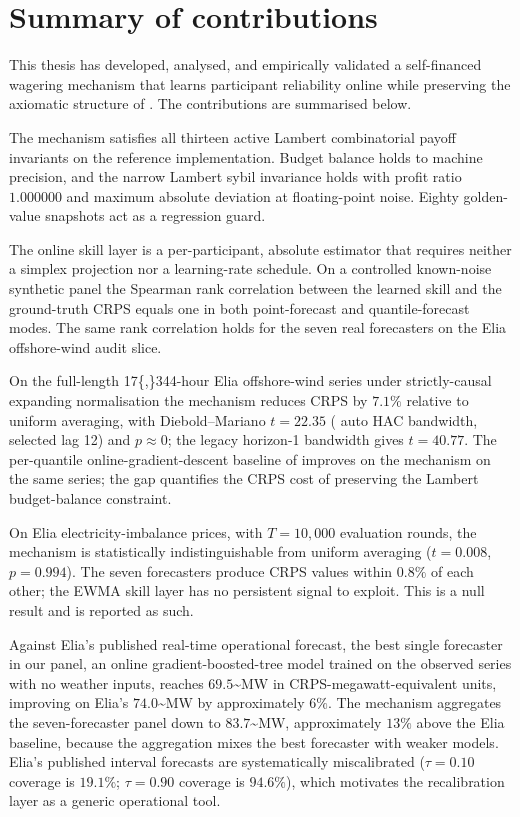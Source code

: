 \documentclass[
  11pt,
  a4paper,
  oneside]{report}
\begin{document}
\section{Summary of contributions}\label{summary-of-contributions}

This thesis has developed, analysed, and empirically validated a
self-financed wagering mechanism that learns participant reliability
online while preserving the axiomatic structure of
\citet{lambert2008selffinanced}. The contributions are summarised below.

The mechanism satisfies all thirteen active Lambert combinatorial payoff
invariants on the reference implementation. Budget balance holds to
machine precision, and the narrow Lambert sybil invariance holds with
profit ratio \(1.000000\) and maximum absolute deviation at
floating-point noise. Eighty golden-value snapshots act as a regression
guard.

The online skill layer is a per-participant, absolute estimator that
requires neither a simplex projection nor a learning-rate schedule. On a
controlled known-noise synthetic panel the Spearman rank correlation
between the learned skill and the ground-truth CRPS equals one in both
point-forecast and quantile-forecast modes. The same rank correlation
holds for the seven real forecasters on the Elia offshore-wind audit
slice.

On the full-length 17\{,\}344-hour Elia offshore-wind series under
strictly-causal expanding normalisation the mechanism reduces CRPS by
\(7.1\%\) relative to uniform averaging, with Diebold--Mariano
\(t = 22.35\) (\citet{andrews1991hac} auto HAC bandwidth, selected lag 12) and
\(p \approx 0\); the legacy horizon-1 bandwidth gives \(t = 40.77\).
The per-quantile online-gradient-descent baseline of
\citet{vitali2025intermittent} improves on the mechanism on the same
series; the gap quantifies the CRPS cost of preserving the Lambert
budget-balance constraint.

On Elia electricity-imbalance prices, with \(T = 10{,}000\) evaluation
rounds, the mechanism is statistically indistinguishable from uniform
averaging (\(t = 0.008\), \(p = 0.994\)). The seven forecasters produce
CRPS values within \(0.8\%\) of each other; the EWMA skill layer has no
persistent signal to exploit. This is a null result and is reported as
such.

Against Elia's published real-time operational forecast, the best single
forecaster in our panel, an online gradient-boosted-tree model trained
on the observed series with no weather inputs, reaches
\(69.5\)\textasciitilde MW in CRPS-megawatt-equivalent units, improving
on Elia's \(74.0\)\textasciitilde MW by approximately \(6\%\). The
mechanism aggregates the seven-forecaster panel down to
\(83.7\)\textasciitilde MW, approximately \(13\%\) above the Elia
baseline, because the aggregation mixes the best forecaster with weaker
models. Elia's published interval forecasts are systematically
miscalibrated (\(\tau = 0.10\) coverage is \(19.1\%\); \(\tau = 0.90\)
coverage is \(94.6\%\)), which motivates the recalibration layer as a
generic operational tool.
\end{document}
